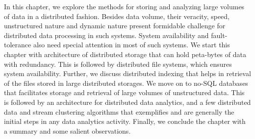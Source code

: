 In this chapter, we explore the methods for storing and analyzing large volumes of data in a distributed fashion. Besides data 
volume, their veracity, speed, unstructured nature and dynamic nature present formidable challenge for distributed data processing 
in such systems. System availability and fault-tolerance also need special attention in most of such systems.
%
We start this chapter with architecture of distributed storage that can hold peta-bytes of data with redundancy. This is followed
by distributed file systems, which ensures system availability. Further, we discuss distributed indexing that helps in retrieval
of the files stored in large distributed storages. We move on to no-SQL databases that facilitates storage and retrieval of large
volumes of unstructured data. This is followed by an architecture for distributed data analytics, and a few distributed data and 
stream clustering algorithms that exemplifies and are generally the initial steps in any data analytics activity. Finally, we conclude 
the chapter with a summary and some salient observations. 

% 







